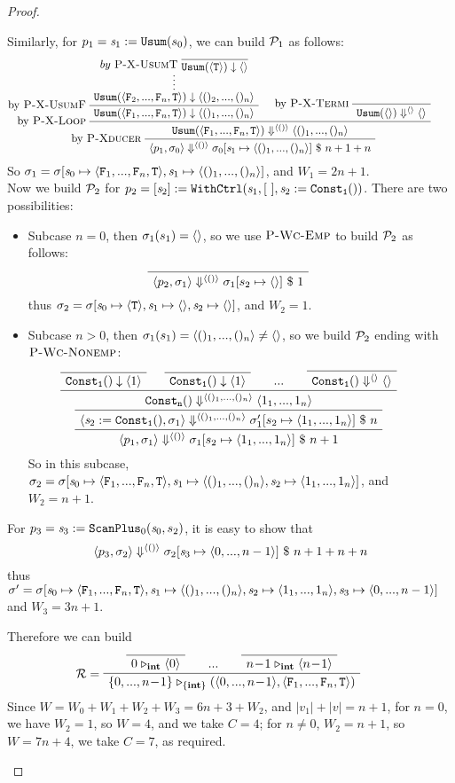 \begin{proof}
\begin{itemize}
	 Similarly, for $p_1 = \sdef{\s_1}{\usum(s_0)}$, we can build $\MP_1$ as follows:
	 $$\PT{
	 	\AC{ \infer*{\blockf{\usum}{\<\F_2,...,\F_n,\T\'>}{\< ()_2,...,()_n\'>}} 
	 		{by \ \PName{X-UsumT} \  \vcenter{\infer {\blockf{\usum}{\singl{\T}}{\emptyv}}{}}}
	 	}
	 	\LeftLabel{by \PName{X-UsumF}}
	 	\UC{\blockf{\usum}{\flagn}{\nunit}}
	 	\AC{}
	 	\LeftLabel{by \PName{X-Termi}}
	 	\UC{\sevalfg{\usum}{\emptyv}{\emptyv} \emptyv}
	 	\LeftLabel{by \PName{X-Loop}}
	 	\BC{\sevalfg{\usum}{\flagn}{\vunit}{\nunit}}
	 	\LeftLabel{by \PName{Xducer}}
	 	\UC{\seval{p_1}{\sgm_0}{\vunit}{\sgm_0[\s_1 \|-> \nunit]}{n+1+n}}
	 }$$
	 So $\sgm_1 = \sgm[\s_0 \|-> \flagn, \s_1 \|-> \nunit]$, and $W_1 = 2n+1$. \\
	 
	 Now we build $\MP_2$ for $p_2 = \withctrl{\s_1}{\sdef{\s_2}{\consta{1}()}}{[ \ ]}{[\s_2]}$. There are two possibilities: 
	 
	 \begin{itemize}
	 	\item Subcase $n=0$, then $\sgm_1(s_1) = \emptyv$, so we use $\PName{Wc-Emp}$ to build $\MP_2$ as follows:	 	
	 	$$\PT{\Axiom{\seval{p_2}{\sgm_1}{\vunit}{\sgm_1[s_2 \|-> \emptyv]}{1}}}$$
	 	thus $\sgm_2 = \sgm[\s_0 \|-> \oT, \s_1 \|-> \emptyv, \s_2 \|-> \emptyv]$, and $W_2 = 1$. 
	 	
		\item Subcase $n >0$, then $\sgm_1(s_1) = \nunit \neq \emptyv$, so we build $\MP_2$ ending with $\PName{Wc-Nonemp}$:
		$$\PT{
			\Axiom{\blockf{\consta{1}}{}{\singl{1}}}
			\Axiom{\blockf{\consta{1}}{}{\singl{1}}}
			\AC{...}
			\Axiom{\sevalfg{\consta{1}}{}{\emptyv}{\emptyv}}
			\QuaternaryInfC{$\sevalfg{\consta{n}}{}{\nunit}{\<1_1,...,1_n\'>}$}
			\UC{\seval{\sdef{\s_2}{\consta{1}()}}{\sgm_1}{\nunit}
				{\sgm'_1[s_2 \|-> \<1_1,...,1_n\'>]}{n}}
			\UC{\seval{p_1}{\sgm_1}{\vunit}{\sgm_1[s_2 \|-> \<1_1,...,1_n\'>]}{n+1}}}$$
	 	So in this subcase, $\sgm_2 = \sgm[\s_0 \|-> \flagn, \s_1 \|-> \nunit, \s_2 \|-> \<1_1,...,1_n\'>]$, and $W_2 = n+1$.
	 \end{itemize}

	 For $p_3 = \sdef{\s_3}{\scan_{0}(\s_0,s_2)}$, it is easy to show that 
	 $$\seval{p_3}{\sgm_2}{\vunit}{\sgm_2[\s_3 \|-> \<0,...,n-1\'>]}{n+1+n+n}$$ 
	 thus $\sgm' = \sgm[\s_0 \|-> \flagn, \s_1 \|-> \nunit, \s_2 \|-> \<1_1,...,1_n\'>, \s_3 \|-> \<0,...,n-1\'>]$ 
	 and $W_3= 3n+1$. 
	 
	 Therefore we can build 
	 $$\PT{
	 	\Axiom{\ValRep{0}{\int}{\singl{0}}}
	 	\AC{...}
	 	\Axiom{\ValRep{n\!-\!1}{\int}{\singl{n\!-\!1}}}
	 	\LeLa{\MR =}
	 	\TC{\ValRep{\{0,...,n\!-\!1\}}{\tseq{\int}}{(\<0,...,n\!-\!1\'>,\flagn)}}
	 }$$
	 Since $W = W_0+W_1+W_2+W_3 = 6n+3 + W_2$, and $|v_1|+|v| = n+1$,
     for $n=0$, we have $W_2=1$, so $W = 4 $, and we take $C = 4$;
     for $n \neq 0$, $W_2 = n+1$, so $W= 7n+4$,  we take $C=7$, as required.
	 	
	
\end{itemize}
\end{proof}

